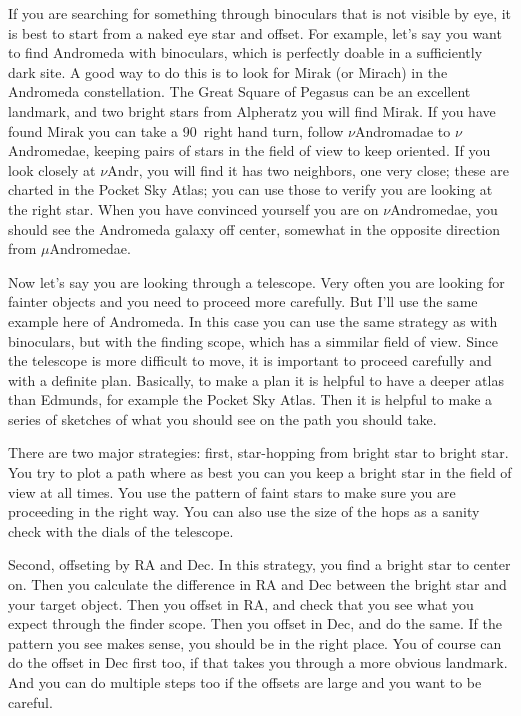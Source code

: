\documentclass[12pt, preprint]{aastex}
\begin{document}
If you are searching for something through binoculars that is not
visible by eye, it is best to start from a naked eye star and
offset. For example, let's say you want to find Andromeda with
binoculars, which is perfectly doable in a sufficiently dark site. A
good way to do this is to look for Mirak (or Mirach) in the Andromeda
constellation. The Great Square of Pegasus can be an excellent
landmark, and two bright stars from Alpheratz you will find Mirak. If
you have found Mirak you can take a 90\degree\ right hand turn, follow
$\nu$Andromadae to $\nu$Andromedae, keeping pairs of stars in the
field of view to keep oriented. If you look closely at $\nu$Andr, you
will find it has two neighbors, one very close; these are charted in
the Pocket Sky Atlas; you can use those to verify you are looking at
the right star. When you have convinced yourself you are on
$\nu$Andromedae, you should see the Andromeda galaxy off center,
somewhat in the opposite direction from $\mu$Andromedae.

Now let's say you are looking through a telescope. Very often you are
looking for fainter objects and you need to proceed more
carefully. But I'll use the same example here of Andromeda. In this
case you can use the same strategy as with binoculars, but with the
finding scope, which has a simmilar field of view. Since the telescope
is more difficult to move, it is important to proceed carefully and
with a definite plan. Basically, to make a plan it is helpful to have
a deeper atlas than Edmunds, for example the Pocket Sky Atlas. Then
it is helpful to make a series of sketches of what you should see on
the path you should take.

There are two major strategies: first, star-hopping from bright star
to bright star. You try to plot a path where as best you can you keep
a bright star in the field of view at all times. You use the pattern
of faint stars to make sure you are proceeding in the right way. You
can also use the size of the hops as a sanity check with the dials of
the telescope.

Second, offseting by RA and Dec. In this strategy, you find a bright
star to center on. Then you calculate the difference in RA and Dec
between the bright star and your target object. Then you offset in RA,
and check that you see what you expect through the finder scope. Then
you offset in Dec, and do the same. If the pattern you see makes
sense, you should be in the right place. You of course can do the
offset in Dec first too, if that takes you through a more obvious
landmark. And you can do multiple steps too if the offsets are large
and you want to be careful.
\end{document}
